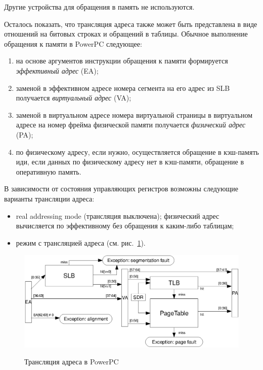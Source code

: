 Другие устройства для обращения в память не используются.

Осталось показать, что трансляция адреса также может быть представлена в виде
отношений на битовых строках и обращений в таблицы. Обычное выполнение
обращения к памяти в PowerPC следующее:
\begin{enumerate}
    \item на основе аргументов инструкции обращения к памяти формируется \emph{эффективный
адрес} (EA);
    \item заменой в эффективном адресе номера сегмента на его адрес из SLB получается
\emph{виртуальный адрес} (VA);
    \item заменой в виртуальном адресе номера виртуальной страницы в виртуальном адресе на номер
фрейма физической памяти получается \emph{физический адрес} (PA);
    \item по физическому адресу, если нужно, осуществляется обращение в
кэш-память иди, если данных по физическому адресу нет в кэш-памяти, обращение в
оперативную память.
\end{enumerate}

В зависимости от состояния управляющих регистров возможны следующие варианты
трансляции адреса:
\begin{itemize}
  \item real addressing mode (трансляция выключена); физический адрес
вычисляется по эффективному без обращения к каким-либо таблицам;
  \item режим с трансляцией адреса (см. рис.~\ref{fig:ppc_address_translation}).
\end{itemize}

\begin{figure}[h] \center
  \includegraphics[width=\textwidth]{4.analysis/ppc_addrtrans}\\
  \caption{Трансляция адреса в PowerPC}\label{fig:ppc_address_translation}
\end{figure}



